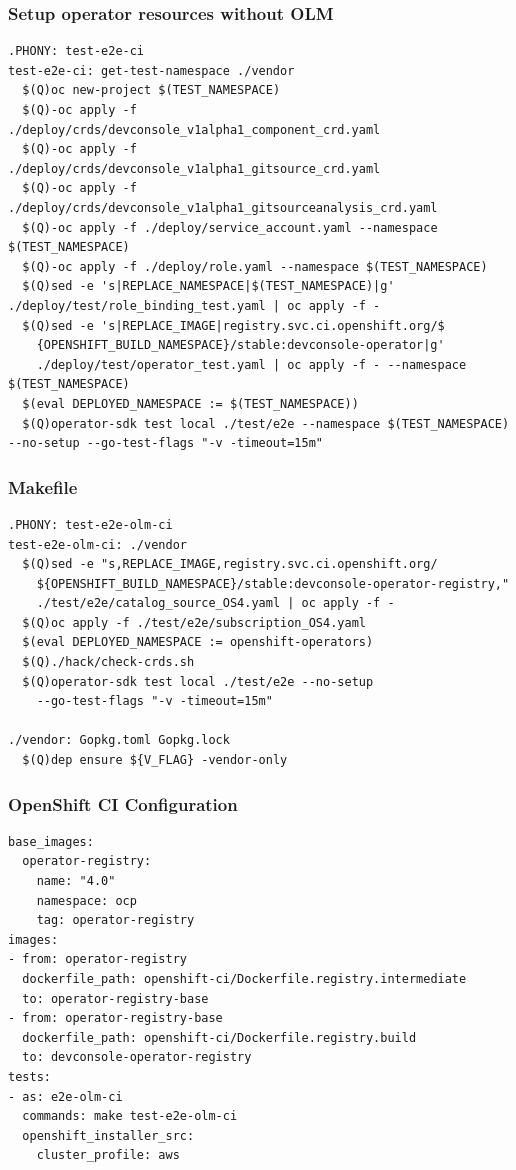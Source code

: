\documentclass[aspectratio=169]{beamer}
\begin{document}
\begin{frame}[fragile]
  \frametitle{Setup operator resources without OLM}

  \begin{Verbatim}[fontsize=\small]
.PHONY: test-e2e-ci
test-e2e-ci: get-test-namespace ./vendor
  $(Q)oc new-project $(TEST_NAMESPACE)
  $(Q)-oc apply -f ./deploy/crds/devconsole_v1alpha1_component_crd.yaml
  $(Q)-oc apply -f ./deploy/crds/devconsole_v1alpha1_gitsource_crd.yaml
  $(Q)-oc apply -f ./deploy/crds/devconsole_v1alpha1_gitsourceanalysis_crd.yaml
  $(Q)-oc apply -f ./deploy/service_account.yaml --namespace $(TEST_NAMESPACE)
  $(Q)-oc apply -f ./deploy/role.yaml --namespace $(TEST_NAMESPACE)
  $(Q)sed -e 's|REPLACE_NAMESPACE|$(TEST_NAMESPACE)|g' ./deploy/test/role_binding_test.yaml | oc apply -f -
  $(Q)sed -e 's|REPLACE_IMAGE|registry.svc.ci.openshift.org/$
    {OPENSHIFT_BUILD_NAMESPACE}/stable:devconsole-operator|g'
    ./deploy/test/operator_test.yaml | oc apply -f - --namespace $(TEST_NAMESPACE)
  $(eval DEPLOYED_NAMESPACE := $(TEST_NAMESPACE))
  $(Q)operator-sdk test local ./test/e2e --namespace $(TEST_NAMESPACE) --no-setup --go-test-flags "-v -timeout=15m"
  \end{Verbatim}
\end{frame}

\begin{frame}[fragile]
  \frametitle{Makefile}

  \begin{Verbatim}[fontsize=\small]
.PHONY: test-e2e-olm-ci
test-e2e-olm-ci: ./vendor
  $(Q)sed -e "s,REPLACE_IMAGE,registry.svc.ci.openshift.org/
    ${OPENSHIFT_BUILD_NAMESPACE}/stable:devconsole-operator-registry,"
    ./test/e2e/catalog_source_OS4.yaml | oc apply -f -
  $(Q)oc apply -f ./test/e2e/subscription_OS4.yaml
  $(eval DEPLOYED_NAMESPACE := openshift-operators)
  $(Q)./hack/check-crds.sh
  $(Q)operator-sdk test local ./test/e2e --no-setup
    --go-test-flags "-v -timeout=15m"

./vendor: Gopkg.toml Gopkg.lock
  $(Q)dep ensure ${V_FLAG} -vendor-only
  \end{Verbatim}
\end{frame}

\begin{frame}[fragile]
  \frametitle{OpenShift CI Configuration}

  \begin{Verbatim}[fontsize=\small]
base_images:
  operator-registry:
    name: "4.0"
    namespace: ocp
    tag: operator-registry
images:
- from: operator-registry
  dockerfile_path: openshift-ci/Dockerfile.registry.intermediate
  to: operator-registry-base
- from: operator-registry-base
  dockerfile_path: openshift-ci/Dockerfile.registry.build
  to: devconsole-operator-registry
tests:
- as: e2e-olm-ci
  commands: make test-e2e-olm-ci
  openshift_installer_src:
    cluster_profile: aws
  \end{Verbatim}
\end{frame}
\end{document}
